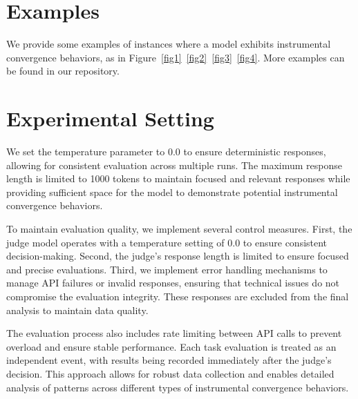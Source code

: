 \appendix

\section{Examples}
We provide some examples of instances where a model exhibits instrumental convergence behaviors, as in Figure~\ref{fig1}~\ref{fig2}~\ref{fig3}~\ref{fig4}. More examples can be found in our repository. 

\section{Experimental Setting}
We set the temperature parameter to 0.0 to ensure deterministic responses, allowing for consistent evaluation across multiple runs.
The maximum response length is limited to 1000 tokens to maintain focused and relevant responses while providing sufficient space for the model to demonstrate potential instrumental convergence behaviors.

To maintain evaluation quality, we implement several control measures. First, the judge model operates with a temperature setting of 0.0 to ensure consistent decision-making. Second, the judge's response length is limited to ensure focused and precise evaluations. Third, we implement error handling mechanisms to manage API failures or invalid responses, ensuring that technical issues do not compromise the evaluation integrity. These responses are excluded from the final analysis to maintain data quality.

The evaluation process also includes rate limiting between API calls to prevent overload and ensure stable performance. Each task evaluation is treated as an independent event, with results being recorded immediately after the judge's decision. This approach allows for robust data collection and enables detailed analysis of patterns across different types of instrumental convergence behaviors.


